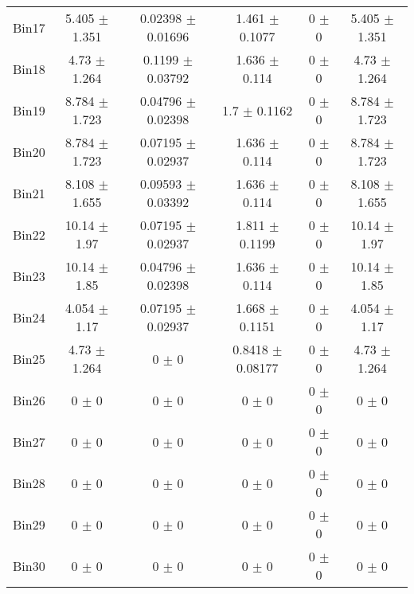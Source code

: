\begin{tabular}{@{\extracolsep{4pt}}lccccc@{}}
     Bin17 & 5.405 $\pm$ 1.351 & 0.02398 $\pm$ 0.01696 & 1.461 $\pm$ 0.1077 & 0 $\pm$ 0 & 5.405 $\pm$ 1.351 \\ 
     Bin18 & 4.73 $\pm$ 1.264 & 0.1199 $\pm$ 0.03792 & 1.636 $\pm$ 0.114 & 0 $\pm$ 0 & 4.73 $\pm$ 1.264 \\ 
     Bin19 & 8.784 $\pm$ 1.723 & 0.04796 $\pm$ 0.02398 & 1.7 $\pm$ 0.1162 & 0 $\pm$ 0 & 8.784 $\pm$ 1.723 \\ 
     Bin20 & 8.784 $\pm$ 1.723 & 0.07195 $\pm$ 0.02937 & 1.636 $\pm$ 0.114 & 0 $\pm$ 0 & 8.784 $\pm$ 1.723 \\ 
     Bin21 & 8.108 $\pm$ 1.655 & 0.09593 $\pm$ 0.03392 & 1.636 $\pm$ 0.114 & 0 $\pm$ 0 & 8.108 $\pm$ 1.655 \\ 
     Bin22 & 10.14 $\pm$ 1.97 & 0.07195 $\pm$ 0.02937 & 1.811 $\pm$ 0.1199 & 0 $\pm$ 0 & 10.14 $\pm$ 1.97 \\ 
     Bin23 & 10.14 $\pm$ 1.85 & 0.04796 $\pm$ 0.02398 & 1.636 $\pm$ 0.114 & 0 $\pm$ 0 & 10.14 $\pm$ 1.85 \\ 
     Bin24 & 4.054 $\pm$ 1.17 & 0.07195 $\pm$ 0.02937 & 1.668 $\pm$ 0.1151 & 0 $\pm$ 0 & 4.054 $\pm$ 1.17 \\ 
     Bin25 & 4.73 $\pm$ 1.264 & 0 $\pm$ 0 & 0.8418 $\pm$ 0.08177 & 0 $\pm$ 0 & 4.73 $\pm$ 1.264 \\ 
     Bin26 & 0 $\pm$ 0 & 0 $\pm$ 0 & 0 $\pm$ 0 & 0 $\pm$ 0 & 0 $\pm$ 0 \\ 
     Bin27 & 0 $\pm$ 0 & 0 $\pm$ 0 & 0 $\pm$ 0 & 0 $\pm$ 0 & 0 $\pm$ 0 \\ 
     Bin28 & 0 $\pm$ 0 & 0 $\pm$ 0 & 0 $\pm$ 0 & 0 $\pm$ 0 & 0 $\pm$ 0 \\ 
     Bin29 & 0 $\pm$ 0 & 0 $\pm$ 0 & 0 $\pm$ 0 & 0 $\pm$ 0 & 0 $\pm$ 0 \\ 
     Bin30 & 0 $\pm$ 0 & 0 $\pm$ 0 & 0 $\pm$ 0 & 0 $\pm$ 0 & 0 $\pm$ 0 \\ 
\hline\hline
  \end{tabular}
